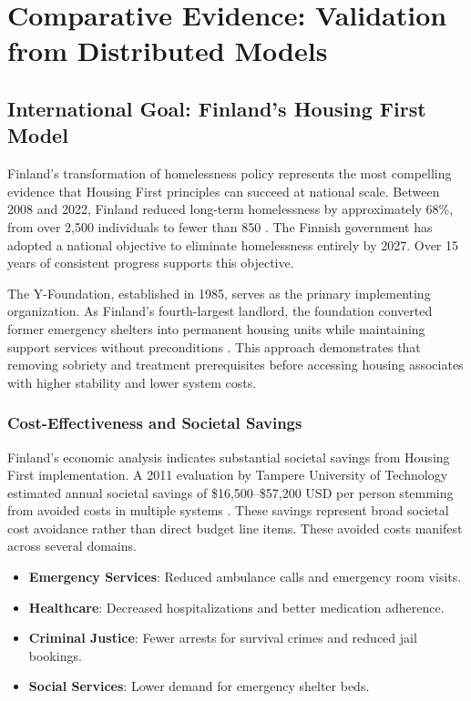 \documentclass[12pt, letterpaper]{article}
\begin{document}
\newpage

\section{Comparative Evidence: Validation from Distributed Models}

\subsection{International Goal: Finland's Housing First Model}

Finland's transformation of homelessness policy represents the most compelling evidence that Housing First principles can succeed at national scale. Between 2008 and 2022, Finland reduced long-term homelessness by approximately 68\%, from over 2,500 individuals to fewer than 850 \citep{sdg16plus_2023}. The Finnish government has adopted a national objective to eliminate homelessness entirely by 2027. Over 15 years of consistent progress supports this objective.

The Y-Foundation, established in 1985, serves as the primary implementing organization. As Finland's fourth-largest landlord, the foundation converted former emergency shelters into permanent housing units while maintaining support services without preconditions \citep{the_atlas_2023}. This approach demonstrates that removing sobriety and treatment prerequisites before accessing housing associates with higher stability and lower system costs.

\subsubsection{Cost-Effectiveness and Societal Savings}

Finland's economic analysis indicates substantial societal savings from Housing First implementation. A 2011 evaluation by Tampere University of Technology estimated annual societal savings of \$16,500--\$57,200 USD per person stemming from avoided costs in multiple systems \citep{sdg16plus_2023}. These savings represent broad societal cost avoidance rather than direct budget line items. These avoided costs manifest across several domains.

\begin{itemize}
    \item \textbf{Emergency Services}: Reduced ambulance calls and emergency room visits.
    \item \textbf{Healthcare}: Decreased hospitalizations and better medication adherence.
    \item \textbf{Criminal Justice}: Fewer arrests for survival crimes and reduced jail bookings.
    \item \textbf{Social Services}: Lower demand for emergency shelter beds.
\end{itemize}
\end{document}
